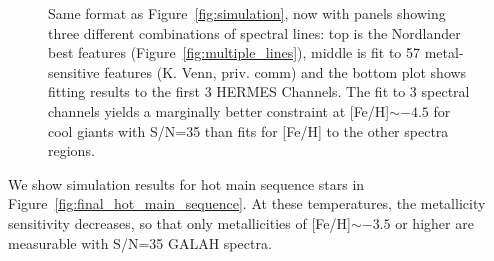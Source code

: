 \documentclass[]{aastex631}
\newcommand{\feh}{[Fe/H]\xspace}
\begin{document}
\begin{figure}



\caption{Same format as Figure~\ref{fig:simulation}, now with panels showing three different combinations of spectral lines: top is the Nordlander best features (Figure~\ref{fig:multiple_lines}), middle is fit to 57 metal-sensitive features (K. Venn, priv. comm) and the bottom plot shows fitting results to the first 3 HERMES Channels. The fit to 3 spectral channels yields a marginally better constraint at \feh $\sim-4.5$ for cool giants with S/N=35 than fits for \feh to the other spectra regions.
}
\label{fig:final_cool_giant}
\end{figure}

We show simulation results for hot main sequence stars in Figure~\ref{fig:final_hot_main_sequence}. At these temperatures, the metallicity sensitivity decreases, so that only metallicities of \feh $\sim-3.5$ or higher are measurable with S/N=35 GALAH spectra.
\end{document}
